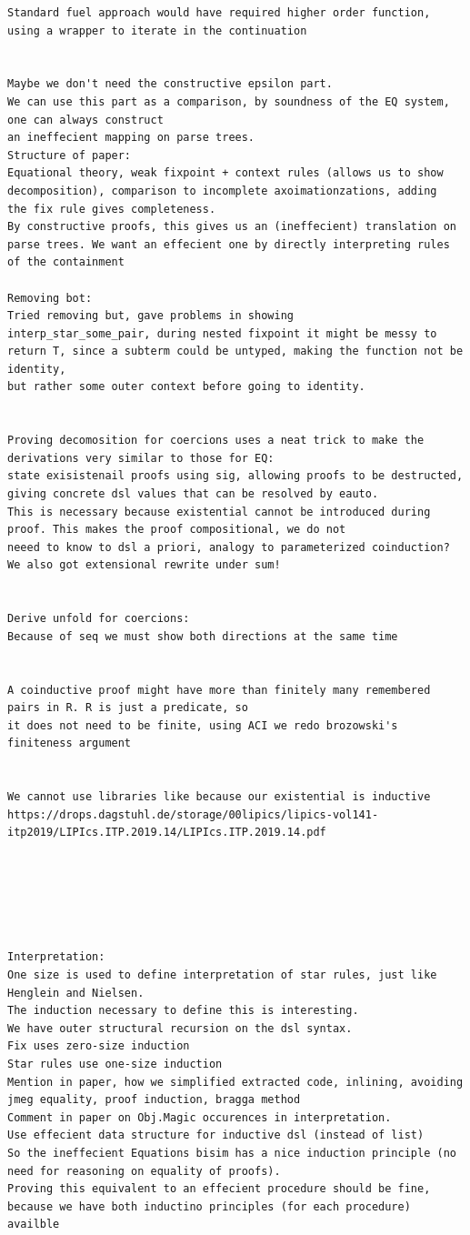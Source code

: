 \documentclass[a4paper,UKenglish,cleveref, autoref, thm-restate]{lipics-v2021}
\begin{document}
\begin{verbatim}
Standard fuel approach would have required higher order function, using a wrapper to iterate in the continuation


Maybe we don't need the constructive epsilon part.
We can use this part as a comparison, by soundness of the EQ system, one can always construct 
an ineffecient mapping on parse trees. 
Structure of paper:
Equational theory, weak fixpoint + context rules (allows us to show decomposition), comparison to incomplete axoimationzations, adding
the fix rule gives completeness.
By constructive proofs, this gives us an (ineffecient) translation on parse trees. We want an effecient one by directly interpreting rules of the containment

Removing bot:
Tried removing but, gave problems in showing
interp_star_some_pair, during nested fixpoint it might be messy to return T, since a subterm could be untyped, making the function not be identity,
but rather some outer context before going to identity.


Proving decomosition for coercions uses a neat trick to make the derivations very similar to those for EQ:
state exisistenail proofs using sig, allowing proofs to be destructed, giving concrete dsl values that can be resolved by eauto.
This is necessary because existential cannot be introduced during proof. This makes the proof compositional, we do not 
neeed to know to dsl a priori, analogy to parameterized coinduction?
We also got extensional rewrite under sum!


Derive unfold for coercions:
Because of seq we must show both directions at the same time


A coinductive proof might have more than finitely many remembered pairs in R. R is just a predicate, so 
it does not need to be finite, using ACI we redo brozowski's finiteness argument


We cannot use libraries like because our existential is inductive 
https://drops.dagstuhl.de/storage/00lipics/lipics-vol141-itp2019/LIPIcs.ITP.2019.14/LIPIcs.ITP.2019.14.pdf






Interpretation:
One size is used to define interpretation of star rules, just like Henglein and Nielsen.
The induction necessary to define this is interesting.
We have outer structural recursion on the dsl syntax.
Fix uses zero-size induction
Star rules use one-size induction
Mention in paper, how we simplified extracted code, inlining, avoiding jmeg equality, proof induction, bragga method
Comment in paper on Obj.Magic occurences in interpretation.
Use effecient data structure for inductive dsl (instead of list)
So the ineffecient Equations bisim has a nice induction principle (no need for reasoning on equality of proofs).
Proving this equivalent to an effecient procedure should be fine, because we have both inductino principles (for each procedure) availble
\end{verbatim}
\end{document}
